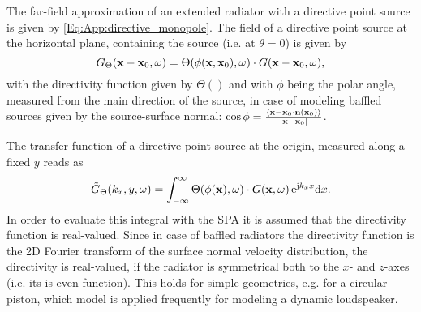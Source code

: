 The far-field approximation of an extended radiator with a directive point source is given by \eqref{Eq:App:directive_monopole}.
The field of a directive point source at the horizontal plane, containing the source (i.e. at $\theta = 0$) is given by
\begin{equation}
G_{\Theta}(\mathbf{x}-\mathbf{x}_0,\omega) = \Theta(\phi(\mathbf{x},\mathbf{x}_0),\omega) \cdot
G(\mathbf{x}-\mathbf{x}_0,\omega),
\end{equation}
with the directivity function given by $\Theta()$ and with $\phi$ being the polar angle, measured from the main direction of the source, in case of modeling baffled sources given by the source-surface normal: $\cos \phi = \frac{\left< \mathbf{x}-\mathbf{x}_0 \cdot \mathbf{n}(\mathbf{x}_0) \right>}{|\mathbf{x}-\mathbf{x}_0|}$.

The transfer function of a directive point source at the origin, measured along a fixed $y$ reads as 
\begin{equation}
\tilde{G}_{\Theta}(k_x,y,\omega) = \int_{-\infty}^{\infty} \Theta(\phi(\mathbf{x}),\omega) \cdot
G(\mathbf{x},\omega) \, \mathrm{e}^{\mathrm{j} k_x x} \mathrm{d} x.
\end{equation}
In order to evaluate this integral with the SPA it is assumed that the directivity function is real-valued.
Since in case of baffled radiators the directivity function is the 2D Fourier transform of the surface normal velocity distribution, the directivity is real-valued, if the radiator is symmetrical both to the $x$- and $z$-axes (i.e. its is even function).
This holds for simple geometries, e.g. for a circular piston, which model is applied frequently for modeling a dynamic loudspeaker.

